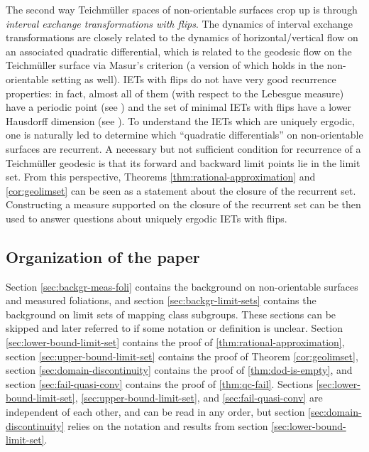 \documentclass[12pt, reqno]{amsart}
\begin{document}
The second way Teichm\"uller spaces of non-orientable surfaces crop up is through \emph{interval exchange transformations with flips}.
The dynamics of interval exchange transformations are closely related to the dynamics of horizontal/vertical flow on an associated quadratic differential, which is related to the geodesic flow on the Teichm\"uller surface via Masur's criterion (a version of which holds in the non-orientable setting as well).
IETs with flips do not have very good recurrence properties: in fact, almost all of them (with respect to the Lebesgue measure) have a periodic point (see \cite{nogueira_1989}) and the set of minimal IETs with flips have a lower Hausdorff dimension (see \cite{skripchenko2018hausdorff}).
To understand the IETs which are uniquely ergodic, one is naturally led to determine which ``quadratic differentials'' on non-orientable surfaces are recurrent.
A necessary but not sufficient condition for recurrence of a Teichm\"uller geodesic is that its forward and backward limit points lie in the limit set.
From this perspective, Theorems \ref{thm:rational-approximation} and \ref{cor:geolimset} can
be seen as a statement about the closure of the recurrent set.
Constructing a measure supported on the closure of the recurrent set can be then used to answer questions about uniquely ergodic IETs with flips.

\subsection*{Organization of the paper}
Section \ref{sec:backgr-meas-foli} contains the background on non-orientable surfaces and measured foliations, and section \ref{sec:backgr-limit-sets} contains the background on limit sets of mapping class subgroups.
These sections can be skipped and later referred to if some notation or definition is unclear.
Section \ref{sec:lower-bound-limit-set} contains the proof of \autoref{thm:rational-approximation}, section \ref{sec:upper-bound-limit-set} contains the proof of Theorem \ref{cor:geolimset}, section \ref{sec:domain-discontinuity} contains the proof of \autoref{thm:dod-is-empty}, and section \ref{sec:fail-quasi-conv} contains the proof of \autoref{thm:qc-fail}.
Sections \ref{sec:lower-bound-limit-set}, \ref{sec:upper-bound-limit-set}, and \ref{sec:fail-quasi-conv} are independent of each other, and can be read in any order, but section \ref{sec:domain-discontinuity} relies on the notation and results from section \ref{sec:lower-bound-limit-set}.

\end{document}
